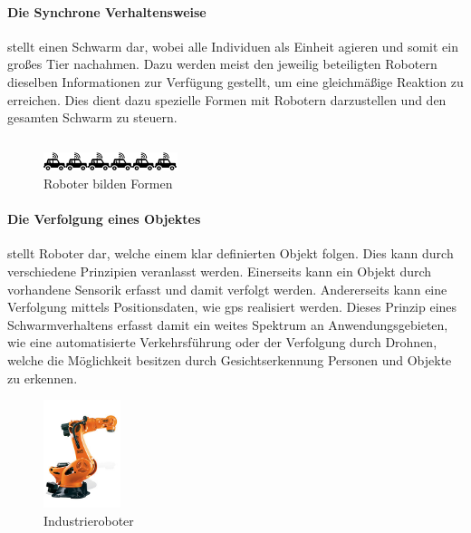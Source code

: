 \paragraph{Die Synchrone Verhaltensweise} stellt einen Schwarm dar, wobei alle Individuen als Einheit agieren und somit ein großes Tier nachahmen. Dazu werden meist den jeweilig beteiligten Robotern dieselben Informationen zur Verfügung gestellt, um eine gleichmäßige Reaktion zu erreichen. Dies dient dazu spezielle Formen mit Robotern darzustellen und den gesamten Schwarm zu steuern.

\begin{verbatim}
\end{verbatim}
\newpage

\begin{figure}
	\begin{center}
		\includegraphics[width=0.35\textwidth]{images/technische_grundlagen/verkehr.png}
	\end{center}
	\caption{Roboter bilden Formen \cite{ETHZuerich.InduzierterVerkehr}}
	\label{fig:verkehr}
\end{figure}
\paragraph{Die Verfolgung eines Objektes} stellt Roboter dar, welche einem klar definierten Objekt folgen. Dies kann durch verschiedene Prinzipien veranlasst werden. Einerseits kann ein Objekt durch vorhandene Sensorik erfasst und damit verfolgt werden. Andererseits kann eine Verfolgung mittels Positionsdaten, wie \gls{gps} realisiert werden. Dieses Prinzip eines Schwarmverhaltens erfasst damit ein weites Spektrum an Anwendungsgebieten, wie eine automatisierte Verkehrsführung oder der Verfolgung durch Drohnen, welche die Möglichkeit besitzen durch Gesichtserkennung Personen und Objekte zu erkennen.

\begin{figure}
	\begin{center}
		\includegraphics[width=0.2\textwidth]{images/technische_grundlagen/industrie.jpg}
	\end{center}
	\caption{Industrieroboter \cite{KUKA.IndustrieroboterKUKA}}
	\label{fig:industrie}
\end{figure}
